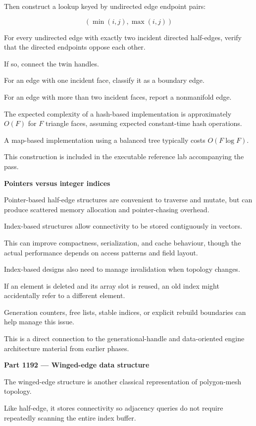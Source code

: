 Then construct a lookup keyed by undirected edge endpoint pairs:

\[
(\min(i,j),\max(i,j))
\]

For every undirected edge with exactly two incident directed half-edges, verify that the directed endpoints oppose each other.

If so, connect the twin handles.

For an edge with one incident face, classify it as a boundary edge.

For an edge with more than two incident faces, report a nonmanifold edge.

The expected complexity of a hash-based implementation is approximately \(O(F)\) for \(F\) triangle faces, assuming expected constant-time hash operations.

A map-based implementation using a balanced tree typically costs \(O(F\log F)\).

This construction is included in the executable reference lab accompanying the pass.

\textbf{Pointers versus integer indices}

Pointer-based half-edge structures are convenient to traverse and mutate, but can produce scattered memory allocation and pointer-chasing overhead.

Index-based structures allow connectivity to be stored contiguously in vectors.

This can improve compactness, serialization, and cache behaviour, though the actual performance depends on access patterns and field layout.

Index-based designs also need to manage invalidation when topology changes.

If an element is deleted and its array slot is reused, an old index might accidentally refer to a different element.

Generation counters, free lists, stable indices, or explicit rebuild boundaries can help manage this issue.

This is a direct connection to the generational-handle and data-oriented engine architecture material from earlier phases.

\textbf{Part 1192 --- Winged-edge data structure}

The winged-edge structure is another classical representation of polygon-mesh topology.

Like half-edge, it stores connectivity so adjacency queries do not require repeatedly scanning the entire index buffer.

